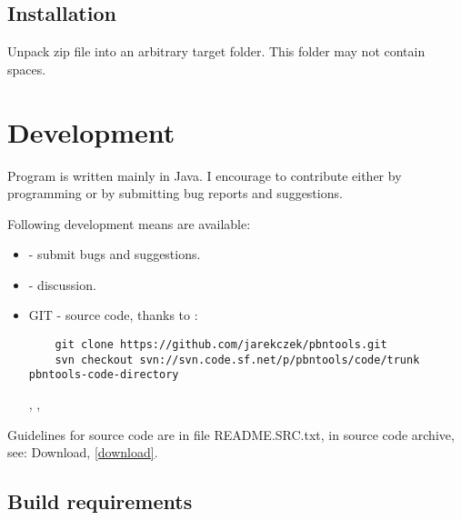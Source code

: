 \documentclass[polish,a4paper,11pt,oneside]{article}
\begin{document}
\subsection{Installation}
Unpack zip file into an arbitrary target folder.
This folder may not contain spaces.

\section{Development} \label{dev}

Program is written mainly in Java.
I encourage to contribute either by programming or by submitting bug reports and suggestions.

Following development means are available:

\begin{itemize}
\item
   -
  submit bugs and suggestions.
  
\item
   -
  discussion.
  
\item
  GIT - source code, thanks to 
  :
  \begin{verbatim}
    git clone https://github.com/jarekczek/pbntools.git
    svn checkout svn://svn.code.sf.net/p/pbntools/code/trunk pbntools-code-directory
  \end{verbatim}

  ,
  , 

\end{itemize}

Guidelines for source code are in file README.SRC.txt,
in source code archive, see: Download, \ref{download}.

\subsection{Build requirements}
\end{document}
